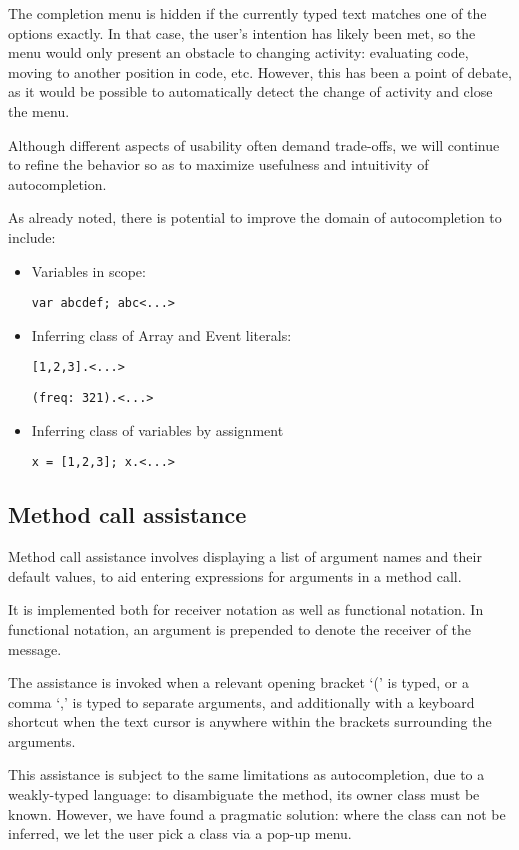 \documentclass[11pt,a4paper]{article}
\begin{document}
The completion menu is hidden if the currently typed text matches one of the options exactly. In
that case, the user's intention has likely been met, so the menu would only present an obstacle to
changing activity: evaluating code, moving to another position in code, etc. However, this has been
a point of debate, as it would be possible to automatically detect the change of activity and close
the menu.

Although different aspects of usability often demand trade-offs, we will continue to refine the
behavior so as to maximize usefulness and intuitivity of autocompletion.

As already noted, there is potential to improve the domain of autocompletion to include:
\begin{itemize}
 \item Variables in scope:

 \verb|var abcdef; abc<...>|

 \item Inferring class of Array and Event literals:

 \verb|[1,2,3].<...>|

 \verb|(freq: 321).<...>|

 \item Inferring class of variables by assignment

 \verb|x = [1,2,3]; x.<...>|

\end{itemize}

\subsection{Method call assistance}

Method call assistance involves displaying a list of argument names and their default values, to aid
entering expressions for arguments in a method call.

It is implemented both for receiver notation as well as functional notation. In functional notation,
an argument is prepended to denote the receiver of the message.

The assistance is invoked when a relevant opening bracket `(' is typed, or a comma `,' is typed to
separate arguments, and additionally with a keyboard shortcut when the text cursor is anywhere
within the brackets surrounding the arguments.

This assistance is subject to the same limitations as autocompletion, due to a weakly-typed
language: to disambiguate the method, its owner class must be known. However, we have found a
pragmatic solution: where the class can not be inferred, we let the user pick a class via a pop-up
menu.
\end{document}
